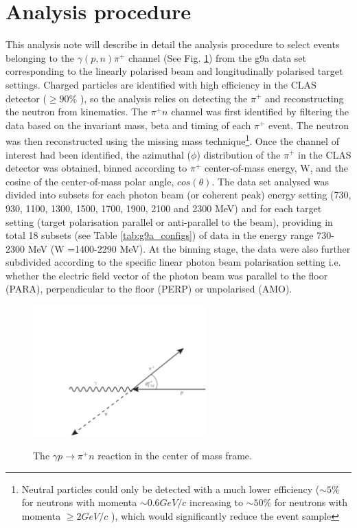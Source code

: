\section{Analysis procedure}
This analysis note will describe in detail the analysis procedure to select events belonging to the $\gamma (p,n) \pi^+$ channel (See Fig. \ref{fig:frost_diagram}) from the g9a data set corresponding to the linearly polarised beam and longitudinally polarised target settings. Charged particles are identified with high efficiency in the CLAS detector ($\geq90\%$ \cite{Mecking2003}), so the analysis relies on detecting the $\pi^+$ and reconstructing the neutron from kinematics. The $\pi^+ n$ channel was first identified by filtering the data based on the invariant mass, beta and timing of each $\pi^+$ event. The neutron was then reconstructed using the missing mass technique\footnote{Neutral particles could only be detected with a much lower efficiency ($\sim5\%$ for neutrons with momenta $\sim 0.6 GeV/c$ increasing to $\sim 50\%$ for neutrons with momenta $\geq2 GeV/c$  \cite{Mecking2003}), which would significantly reduce the event sample}. Once the channel of interest had been identified, the azimuthal ($\phi$) distribution of the $\pi^+$ in the CLAS detector was obtained, binned according to $\pi^+$ center-of-mass energy, W, and the cosine of the center-of-mass polar angle, $cos(\theta)$. The data set analysed  was divided into subsets for each photon beam (or coherent peak) energy setting (730, 930, 1100, 1300, 1500, 1700, 1900, 2100 and 2300 MeV) and for each target setting (target polarisation parallel or anti-parallel to the beam), providing in total 18 subsets (see Table \ref{tab:g9a_configs}) of data in the energy range 730-2300 MeV (W =1400-2290 MeV). At the binning stage, the data were also further subdivided according to the specific linear photon beam polarisation setting i.e. whether the electric field vector of the photon beam was parallel to the floor (PARA), perpendicular to the floor (PERP) or unpolarised (AMO). 
\begin{figure}[htb]
  \begin{center}
    \includegraphics[width=0.6\textwidth]{figures/frost_reaction.pdf} \\
    \caption{The $\gamma p \rightarrow \pi^+ n $ reaction in the center of mass frame. }
    \label{fig:frost_diagram}
  \end{center}
\end{figure}


